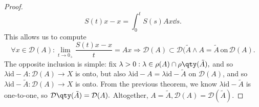 \begin{proof}
\[
	S(t)x -x = \int_0^t S(s)Ax \dd{s}.
\]
This allows us to compute
\[
	\forall x \in \mathcal{D}(A): \lim_{t\to 0_+}\frac{S(t)x- x}{t} = Ax \Rightarrow \mathcal{D}(A) \subset \mathcal{D}(\tilde{A} \wedge A = \tilde{A} \, \text{on} \, \mathcal{D}(A).
\]
The opposite inclusion is simple: fix $\lambda >0: \lambda \in \rho(A) \cap \rho\qty(\tilde{A}),$ and so $\lambda \text{id} - A: \mathcal{D}(A) \to X$ is onto, but also $\lambda \text{id} - A = \lambda \text{id} - \tilde{A}$ on $\mathcal{D}(A)$, and so $\lambda \text{id}-\tilde{A}: \mathcal{D}(A) \to X$ is onto. From the previous theorem, we know $\lambda \text{id} - \tilde{A}$ is one-to-one, so $\mathcal{D}\qty(\tilde{A}) = \mathcal{D}(A).$ Altogether, $A = \tilde{A}, \mathcal{D}(A) = \mathcal{D}(\tilde{A}).$


\end{proof}

